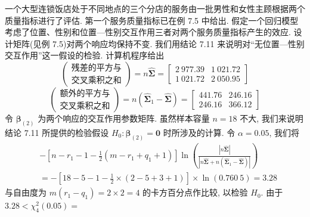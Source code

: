 一个大型连锁饭店处于不同地点的三个分店的服务由一批男性和女性主顾根据两个质量指标进行了评估. 第一个服务质量指标已在例 7.5 中给出. 假定一个回归模型考虑了位置、性别和位置—性别交互作用三者对两个服务质量指标产生的效应. 设计矩阵(见例 7.5)对两个响应均保持不变. 我们用结论 7.11 来说明对“无位置—性别交互作用”这一假设的检验. 计算机程序给出
\[
\left(\begin{array}{c}\text{残差的平方与}\\\text{交叉乘积之和}\end{array}\right)
=n\hat{\boldsymbol{\Sigma}}
=\begin{bmatrix}2\ 977.39&1\ 021.72\\1\ 021.72&2\ 050.95\end{bmatrix}
\]
\[
\left(\begin{array}{c}\text{额外的平方与}\\\text{交叉乘积之和}\end{array}\right)
=n(\hat{\boldsymbol{\Sigma}}_1-\hat{\boldsymbol{\Sigma}})
=\begin{bmatrix}441.76&246.16\\246.16&366.12\end{bmatrix}
\]
令 $\boldsymbol{\beta}_{(2)}$ 为两个响应的交互作用参数矩阵. 虽然样本容量 $n=18$ 不大, 我们来说明结论 7.11 所提供的检验假设 $H_0:\boldsymbol{\beta}_{(2)}=\mathbf{0}$ 时所涉及的计算. 令 $\alpha=0.05$, 我们将
\[
\begin{aligned}
&-\left[n-r_1-1-\frac{1}{2}(m-r_1+q_1+1)\right]\ln\left(\frac{|n\hat{\boldsymbol{\Sigma}}|}{|n\hat{\boldsymbol{\Sigma}}+n(\hat{\boldsymbol{\Sigma}}_1-\hat{\boldsymbol{\Sigma}})|}\right)\\
&=-\left[18-5-1-\frac{1}{2}\times(2-5+3+1)\right]\times\ln(0.760\ 5)=3.28
\end{aligned}
\]
与自由度为 $m(r_1-q_1)=2\times2=4$ 的卡方百分点作比较, 以检验 $H_0$. 由于 $3.28<\chi_4^2(0.05)=$
